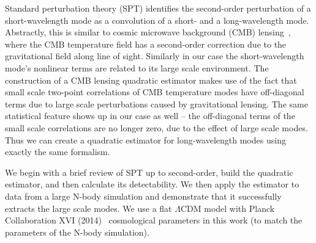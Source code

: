 \documentclass[prd,amsmath,amssymb,floatfix,superscriptaddress,nofootinbib,twocolumn]{revtex4-1}
\begin{document}
Standard perturbation theory (SPT) \cite{Goroff:1986sts}\cite{Makino:1992fs}\cite{Jain:1994sop} identifies the second-order perturbation of a short-wavelength mode as a convolution of a short- and a long-wavelength mode. Abstractly, this is similar to
cosmic microwave background (CMB) lensing~\cite{Hu:2002mr}, where the CMB temperature field has a second-order correction due to the gravitational field along line of sight. Similarly in our case the short-wavelength mode's nonlinear terms are related to its large scale environment.
The construction of a CMB lensing quadratic estimator makes use of the fact that small scale two-point correlations of CMB temperature modes have off-diagonal terms due to large scale perturbations caused by gravitational lensing. The same statistical feature shows up in our case as well -- the off-diagonal terms of the small scale correlations are no longer zero, due to the effect of large scale modes. Thus we can create a quadratic estimator for long-wavelength modes using exactly the same formalism. 

We begin with a brief review of SPT up to second-order, build the quadratic estimator, and then calculate its detectability. We then apply the estimator to data from a large N-body simulation and demonstrate that it successfully extracts the large scale modes. 
We use a flat $\Lambda$CDM model with Planck Collaboration XVI (2014)~\cite{Planck:2014cos} cosmological parameters in this work (to match the parameters of the N-body simulation).\\
\end{document}
